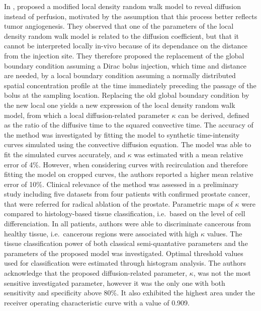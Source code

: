 In \citeyear{Kuenen:2011kr}, \citet{Kuenen:2011kr} proposed a modified local density random walk model to reveal diffusion instead of perfusion, motivated by the assumption that this process better reflects tumor angiogenesis. 
They observed that one of the parameters of the local density random walk model is related to the diffusion coefficient, but that it cannot be interpreted locally in-vivo because of its dependance on the distance from the injection site. 
They therefore proposed the replacement of the global boundary condition assuming a Dirac bolus injection, which time and distance are needed, by a local boundary condition assuming a normally distributed spatial concentration profile at the time immediately preceding the passage of the bolus at the sampling location.
Replacing the old global boundary condition by the new local one yields a new expression of the local density random walk model, from which a local diffusion-related parameter $\kappa$ can be derived, defined as the ratio of the diffusive time to the squared convective time.
The accuracy of the method was investigated by fitting the model to synthetic time-intensity curves simulated using the convective diffusion equation. 
The model was able to fit the simulated curves accurately, and $\kappa$ was estimated with a mean relative error of 4\%. 
However, when considering curves with recirculation and therefore fitting the model on cropped curves, the authors reported a higher mean relative error of 10\%. 
Clinical relevance of the method was assessed in a preliminary study including five datasets from four patients with confirmed prostate cancer, that were referred for radical ablation of the prostate. 
Parametric maps of $\kappa$ were compared to histology-based tissue classification, i.e.~based on the level of cell differenciation.
In all patients, authors were able to discriminate cancerous from healthy tissue, i.e.~cancerous regions were associated with high $\kappa$ values.
The tissue classification power of both classical semi-quantative parameters and the parameters of the proposed model was investigated. 
Optimal threshold values used for classification were estimated through histogram analysis.
The authors acknowledge that the proposed diffusion-related parameter, $\kappa$, was not the most sensitive investigated parameter, however it was the only one with both sensitivity and specificity above 80\%.
It also exhibited the highest area under the receiver operating characteristic curve with a value of 0.909. 

